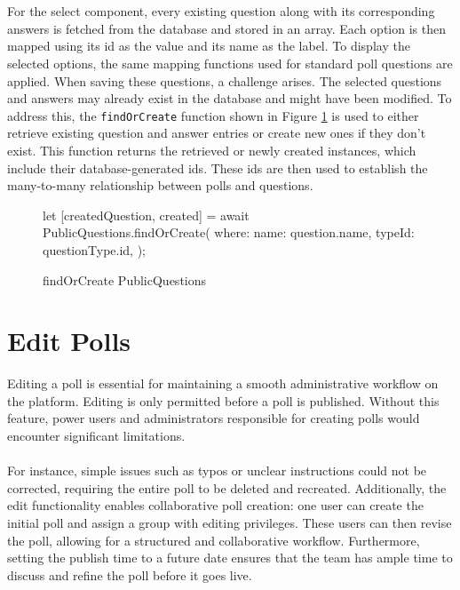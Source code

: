 \documentclass[a4paper,12pt]{report}
\begin{document}
\\ \\
For the select component, every existing question along with its corresponding answers is fetched from the database and stored in an array. Each option is then mapped using its id as the value and its name as the label. To display the selected options, the same mapping functions used for standard poll questions are applied.
When saving these questions, a challenge arises. The selected questions and answers may already exist in the database and might have been modified. To address this, the \texttt{findOrCreate} function shown in Figure \ref{fig:publicQuestions} is used to either retrieve existing question and answer entries or create new ones if they don't exist. This function returns the retrieved or newly created instances, which include their database-generated ids. These ids are then used to establish the many-to-many relationship between polls and questions. \parencite{sequelizedoku} 
\begin{figure}[h!]
\begin{code}
let [createdQuestion, created] = await PublicQuestions.findOrCreate({
	where: {
		name: question.name,
		typeId: questionType.id,
	}
});
\end{code}
	\caption{findOrCreate PublicQuestions}
	\label{fig:publicQuestions}
\end{figure}

\section{Edit Polls}
Editing a poll is essential for maintaining a smooth administrative workflow on the platform. Editing is only permitted before a poll is published. Without this feature, power users and administrators responsible for creating polls would encounter significant limitations. \\ \\
For instance, simple issues such as typos or unclear instructions could not be corrected, requiring the entire poll to be deleted and recreated. Additionally, the edit functionality enables collaborative poll creation: one user can create the initial poll and assign a group with editing privileges. These users can then revise the poll, allowing for a structured and collaborative workflow. Furthermore, setting the publish time to a future date ensures that the team has ample time to discuss and refine the poll before it goes live. \\
\end{document}

